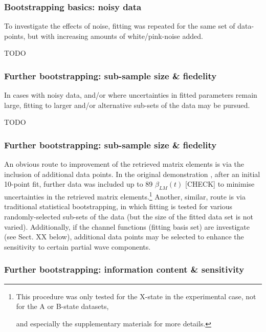 \subsubsection{Bootstrapping basics: noisy data}

To investigate the effects of noise, fitting was repeated for the same set of data-points, but with increasing amounts of white/pink-noise added.

TODO

\subsubsection{Further bootstrapping: sub-sample size \& fiedelity}

In cases with noisy data, and/or where uncertainties in fitted parameters remain large, fitting to larger and/or alternative sub-sets of the data may be pursued.

TODO

\subsubsection{Further bootstrapping: sub-sample size \& fiedelity}

An obvious route to improvement of the retrieved matrix elements is via the inclusion of additional data points. In the original demonstration \cite{marceau2017MolecularFrameReconstruction}, after an initial 10-point fit, further data was included up to 89 $\beta_{LM}(t)$ [CHECK] to minimise uncertainties in the retrieved matrix elements.\footnote{This procedure was only tested for the X-state in the experimental case, not for the A or B-state datasets, %

and especially the supplementary materials for more details.} Another, similar, route is via traditional statistical bootstrapping, in which fitting is tested for various randomly-selected sub-sets of the data (but the size of the fitted data set is not varied). Additionally, if the channel functions (fitting basis set) are investigate (see Sect. XX below), additional data points may be selected to enhance the sensitivity to certain partial wave components.




\subsubsection{Further bootstrapping: information content \& sensitivity}

